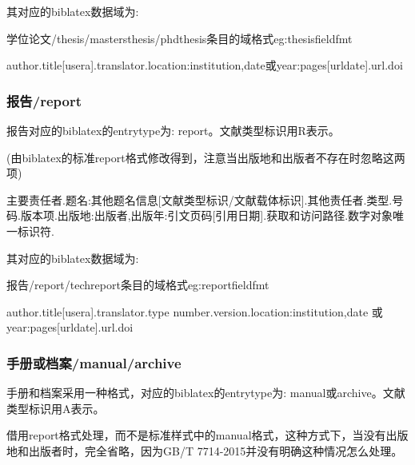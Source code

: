 其对应的biblatex数据域为:
\begin{example}{学位论文/thesis/mastersthesis/phdthesis条目的域格式}{eg:thesisfieldfmt}
\begin{texlist}
author.title[usera].translator.location:institution,date或year:pages[urldate].url.doi
\end{texlist}
\end{example}


\subsubsection{报告/report}
\begin{refentry}{}{}
报告对应的biblatex的entrytype为: report。文献类型标识用R表示。

 (由biblatex的标准report格式修改得到，注意当出版地和出版者不存在时忽略这两项)

主要责任者.题名:其他题名信息[文献类型标识/文献载体标识].其他责任者.类型.号码.版本项.出版地:出版者,出版年:引文页码[引用日期].获取和访问路径.数字对象唯一标识符.
\end{refentry}

其对应的biblatex数据域为:
\begin{example}{报告/report/techreport条目的域格式}{eg:reportfieldfmt}
\begin{texlist}
author.title[usera].translator.type number.version.location:institution,date 或year:pages[urldate].url.doi
\end{texlist}
\end{example}


\subsubsection{手册或档案/manual/archive}
\begin{refentry}{}{}
手册和档案采用一种格式，对应的biblatex的entrytype为: manual或archive。文献类型标识用A表示。

 借用report格式处理，而不是标准样式中的manual格式，这种方式下，当没有出版地和出版者时，完全省略，因为GB/T 7714-2015并没有明确这种情况怎么处理。
\end{refentry}


